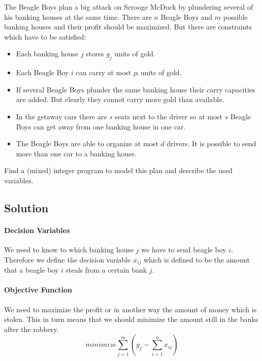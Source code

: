 \documentclass[a4paper, 12pt]{report}
\begin{document}
The Beagle Boys plan a big attack on Scrooge McDuck by plundering several of
his banking houses at the same time. There are $n$ Beagle Boys and $m$ possible
banking houses and their profit should be maximized. But there are constraints
which have to be satisfied:

\begin{itemize}
    \item Each banking house $j$ stores $g_j$ units of gold.
    \item Each Beagle Boy $i$ can carry at most $pᵢ$ units of gold.
    \item If several Beagle Boys plunder the same banking house their carry
          capacities are added. But clearly they cannot carry more gold than
          available.
    \item In the getaway cars there are $s$ seats next to the driver so at most
          $s$ Beagle Boys can get away from one banking house in one car.
    \item The Beagle Boys are able to organize at most $d$ drivers. It is
          possible to send more than one car to a banking house.
\end{itemize}

Find a (mixed) integer program to model this plan and describe the used
variables.

\subsection{Solution}

\paragraph{Decision Variables}

We need to know to which banking house $j$ we have to send beagle boy $i$.
Therefore we define the decision variable $x_{ij}$ which is defined to be the
amount that a beagle boy $i$ steals from a certain bank $j$.

\paragraph{Objective Function}

We need to maximize the profit or in another way the amount of money which is
stolen. This in turn means that we should minimize the amount still in the
banks after the robbery.
\[
    minimize ∑_{j=1}^{m} \left( g_j - ∑_{i=1}^{n} x_{ij} \right)
\]
\end{document}
